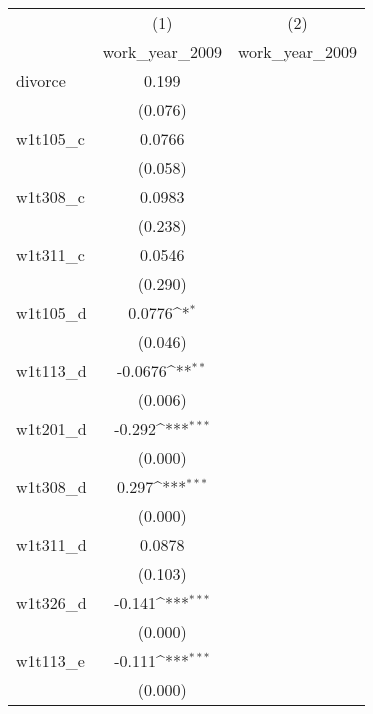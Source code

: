 {
\def\sym#1{\ifmmode^{#1}\else\(^{#1}\)\fi}
\begin{tabular}{l*{2}{c}}
\hline\hline
            &\multicolumn{1}{c}{(1)}&\multicolumn{1}{c}{(2)}\\
            &\multicolumn{1}{c}{work\_year\_2009}&\multicolumn{1}{c}{work\_year\_2009}\\
\hline
divorce     &       0.199         &                     \\
            &     (0.076)         &                     \\
[1em]
w1t105\_c    &      0.0766         &                     \\
            &     (0.058)         &                     \\
[1em]
w1t308\_c    &      0.0983         &                     \\
            &     (0.238)         &                     \\
[1em]
w1t311\_c    &      0.0546         &                     \\
            &     (0.290)         &                     \\
[1em]
w1t105\_d    &      0.0776\sym{*}  &                     \\
            &     (0.046)         &                     \\
[1em]
w1t113\_d    &     -0.0676\sym{**} &                     \\
            &     (0.006)         &                     \\
[1em]
w1t201\_d    &      -0.292\sym{***}&                     \\
            &     (0.000)         &                     \\
[1em]
w1t308\_d    &       0.297\sym{***}&                     \\
            &     (0.000)         &                     \\
[1em]
w1t311\_d    &      0.0878         &                     \\
            &     (0.103)         &                     \\
[1em]
w1t326\_d    &      -0.141\sym{***}&                     \\
            &     (0.000)         &                     \\
[1em]
w1t113\_e    &      -0.111\sym{***}&                     \\
            &     (0.000)         &                     \\

\end{tabular}}
